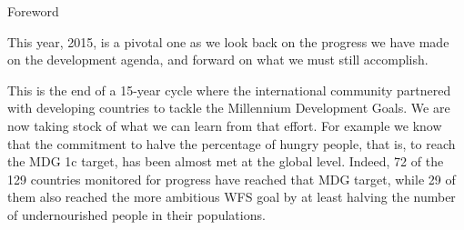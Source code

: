 \documentclass[twoside,web]{faofactbook}
\begin{document}





\thispagestyle{empty}
\ifprint

\else

\fi





{}  %
\setlength{\parskip}{3pt plus 3pt minus 1pt}  %



\Large{Foreword}

\bigskip
\bigskip
\bigskip

\large

This year, 2015, is a pivotal one as we look back on the progress we have made on the development agenda, and forward on what we must still accomplish. 

This is the end of a 15-year cycle where the international community partnered with developing countries to tackle the Millennium Development Goals. We are now taking stock of what we can learn from that effort. For example we know that the commitment to halve the percentage of hungry people, that is, to reach the MDG 1c target, has been almost met at the global level. Indeed, 72 of the 129 countries monitored for progress have reached that MDG target, while 29 of them also reached the more ambitious WFS goal by at least halving the number of undernourished people in their populations. 
\end{document}
